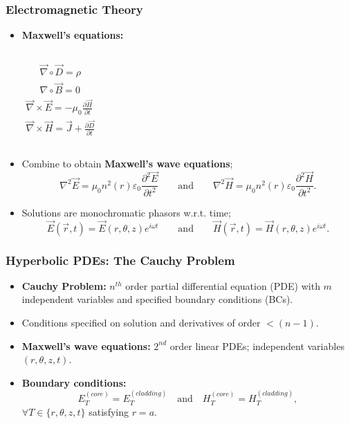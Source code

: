 \documentclass{beamer}
\begin{document}
\begin{frame}
\frametitle{\textbf{Electromagnetic Theory}}
\begin{itemize}
\item \textbf{Maxwell's equations:}
\begin{columns}
\begin{gather}
\vec{\nabla}\circ\vec{D}=\rho\\
{\nabla}\circ\vec{B}=0
\end{gather}
\begin{gather}
\vec{\nabla}\times\vec{E}=-\mu_0\frac{\partial\vec{H}}{\partial t}\\
\vec{\nabla}\times\vec{H}=\vec{J}+\frac{\partial\vec{D}}{\partial t}
\end{gather}
\end{columns}
\item Combine to obtain \textbf{Maxwell's wave equations};
$$\nabla^2\vec{E}=\mu_0 n^2(r)\varepsilon_0\frac{\partial^2\vec{E}}{\partial t^2}\qquad\mbox{and}\qquad\nabla^2\vec{H}=\mu_0 n^2(r)\varepsilon_0\frac{\partial^2\vec{H}}{\partial t^2}.$$
\item Solutions are monochromatic phasors w.r.t. time;
\begin{equation}
\vec{E}(\vec{r},t)=\vec{E}(r,\theta,z)e^{i\omega t}\qquad\mbox{and}\qquad\vec{H}(\vec{r},t)=\vec{H}(r,\theta,z)e^{i\omega t}.
\end{equation}
\end{itemize}
\end{frame}

\begin{frame}
\frametitle{\textbf{Hyperbolic PDEs:} The Cauchy Problem}
\begin{itemize}
\item \textbf{Cauchy Problem:} $n^{th}$ order partial differential equation (PDE) with $m$ independent variables and specified boundary conditions (BCs).
\item Conditions specified on solution and derivatives of order $<(n-1)$. 
\item \textbf{Maxwell's wave equations:} $2^{nd}$ order linear PDEs; independent variables $(r,\theta,z,t)$.
\item \textbf{Boundary conditions:} $$E_{T}^{(core)}=E_{T}^{(cladding)}\quad\mbox{and}\quad H_{T}^{(core)}=H_{T}^{(cladding)},$$ $\forall T\in\{r,\theta,z,t\}$ satisfying $r=a$.
\end{itemize}
\end{frame}
\end{document}
